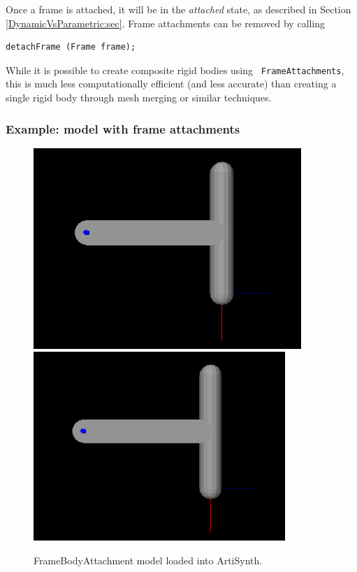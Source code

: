 Once a frame is attached, it
will be in the {\it attached} state, as described in Section
\ref{DynamicVsParametric:sec}.  Frame attachments can be removed by
calling
%
\begin{lstlisting}[]
  detachFrame (Frame frame);   
\end{lstlisting}
%

\begin{sideblock}
While it is possible to create composite rigid bodies using {\tt
FrameAttachments}, this is much less computationally efficient (and
less accurate) than creating a single rigid body through mesh merging
or similar techniques.
\end{sideblock}

\subsubsection{Example: model with frame attachments}

\begin{figure}[ht]
\begin{center}
\iflatexml
 \includegraphics[]{images/FrameBodyAttachment}
\else
 \includegraphics[width=3.75in]{images/FrameBodyAttachment}
\fi
\end{center}
\caption{FrameBodyAttachment model loaded into ArtiSynth.}
\label{FrameBodyAttachment:fig}
\end{figure}

